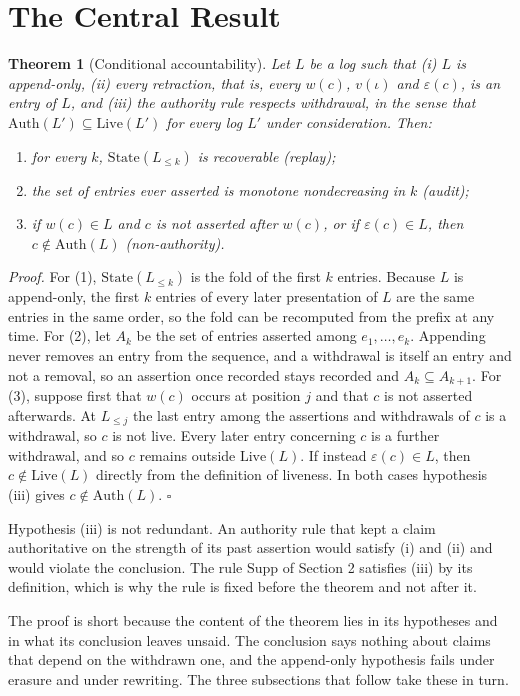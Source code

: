 \documentclass[11pt]{article}
\theoremstyle{plain}
\newtheorem{theorem}{Theorem}
\theoremstyle{definition}
\theoremstyle{remark}
\begin{document}
\section{The Central Result}
\begin{theorem}[Conditional accountability]
Let $L$ be a log such that (i) $L$ is append-only, (ii) every retraction, that is, every $w(c)$, $v(\iota)$ and $\varepsilon(c)$, is an entry of $L$, and (iii) the authority rule respects withdrawal, in the sense that $\mathrm{Auth}(L')\subseteq\mathrm{Live}(L')$ for every log $L'$ under consideration. Then:
\begin{enumerate}
\item for every $k$, $\mathrm{State}(L_{\le k})$ is recoverable (replay);
\item the set of entries ever asserted is monotone nondecreasing in $k$ (audit);
\item if $w(c)\in L$ and $c$ is not asserted after $w(c)$, or if $\varepsilon(c)\in L$, then $c\notin\mathrm{Auth}(L)$ (non-authority).
\end{enumerate}
\end{theorem}
\emph{Proof.} For (1), $\mathrm{State}(L_{\le k})$ is the fold of the first $k$ entries. Because $L$ is append-only, the first $k$ entries of every later presentation of $L$ are the same entries in the same order, so the fold can be recomputed from the prefix at any time. For (2), let $A_k$ be the set of entries asserted among $e_1,\dots,e_k$. Appending never removes an entry from the sequence, and a withdrawal is itself an entry and not a removal, so an assertion once recorded stays recorded and $A_k\subseteq A_{k+1}$. For (3), suppose first that $w(c)$ occurs at position $j$ and that $c$ is not asserted afterwards. At $L_{\le j}$ the last entry among the assertions and withdrawals of $c$ is a withdrawal, so $c$ is not live. Every later entry concerning $c$ is a further withdrawal, and so $c$ remains outside $\mathrm{Live}(L)$. If instead $\varepsilon(c)\in L$, then $c\notin\mathrm{Live}(L)$ directly from the definition of liveness. In both cases hypothesis (iii) gives $c\notin\mathrm{Auth}(L)$. \hfill$\square$

Hypothesis (iii) is not redundant. An authority rule that kept a claim authoritative on the strength of its past assertion would satisfy (i) and (ii) and would violate the conclusion. The rule $\mathrm{Supp}$ of Section 2 satisfies (iii) by its definition, which is why the rule is fixed before the theorem and not after it.

The proof is short because the content of the theorem lies in its hypotheses and in what its conclusion leaves unsaid. The conclusion says nothing about claims that depend on the withdrawn one, and the append-only hypothesis fails under erasure and under rewriting. The three subsections that follow take these in turn.
\end{document}
